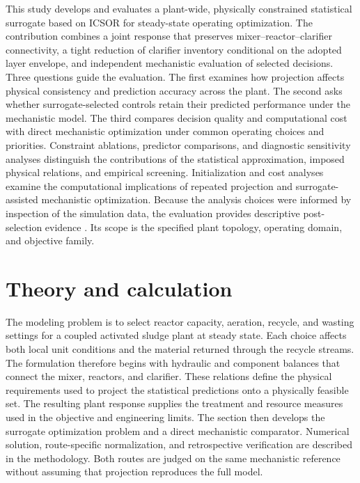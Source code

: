 \documentclass[a4paper,fleqn]{cas-sc}
\begin{document}
This study develops and evaluates a plant-wide, physically constrained statistical surrogate based on ICSOR for steady-state operating optimization. The contribution combines a joint response that preserves mixer--reactor--clarifier connectivity, a tight reduction of clarifier inventory conditional on the adopted layer envelope, and independent mechanistic evaluation of selected decisions. Three questions guide the evaluation. The first examines how projection affects physical consistency and prediction accuracy across the plant. The second asks whether surrogate-selected controls retain their predicted performance under the mechanistic model. The third compares decision quality and computational cost with direct mechanistic optimization under common operating choices and priorities. Constraint ablations, predictor comparisons, and diagnostic sensitivity analyses distinguish the contributions of the statistical approximation, imposed physical relations, and empirical screening. Initialization and cost analyses examine the computational implications of repeated projection and surrogate-assisted mechanistic optimization. Because the analysis choices were informed by inspection of the simulation data, the evaluation provides descriptive post-selection evidence \citep{Kaufman2012}. Its scope is the specified plant topology, operating domain, and objective family.

\section{Theory and calculation}

The modeling problem is to select reactor capacity, aeration, recycle, and wasting settings for a coupled activated sludge plant at steady state. Each choice affects both local unit conditions and the material returned through the recycle streams. The formulation therefore begins with hydraulic and component balances that connect the mixer, reactors, and clarifier. These relations define the physical requirements used to project the statistical predictions onto a physically feasible set. The resulting plant response supplies the treatment and resource measures used in the objective and engineering limits. The section then develops the surrogate optimization problem and a direct mechanistic comparator. Numerical solution, route-specific normalization, and retrospective verification are described in the methodology. Both routes are judged on the same mechanistic reference without assuming that projection reproduces the full model.
\end{document}
